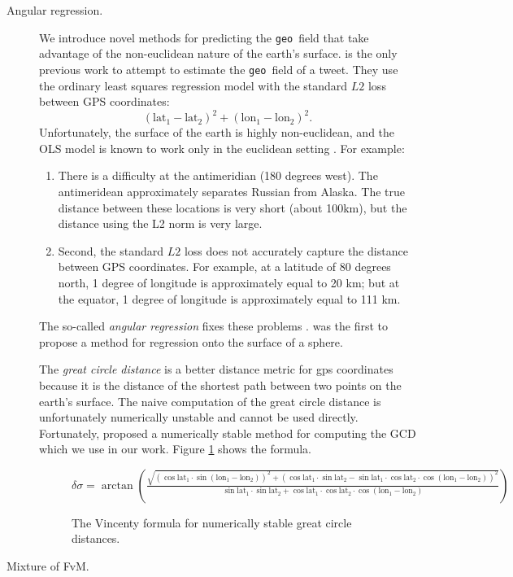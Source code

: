 \documentclass[sigconf,10pt]{acmart}
\newcommand{\tweetdata}[1]{{\texttt{#1}~}}
\newcommand{\geo          }{\tweetdata{geo}}
\newcommand{\lata}{\text{lat}_1}
\newcommand{\latb}{\text{lat}_2}
\newcommand{\latd}{(\lata-\latb)}
\newcommand{\lona}{\text{lon}_1}
\newcommand{\lonb}{\text{lon}_2}
\newcommand{\lond}{(\lona-\lonb)}
\begin{document}
{\begin{description}
\item[Angular regression.]
We introduce novel methods for predicting the \geo field that take advantage of the non-euclidean nature of the earth's surface.
\citet{duong2016near} is the only previous work to attempt to estimate the \geo field of a tweet.
They use the ordinary least squares regression model with the standard $L2$ loss between GPS coordinates:
\begin{equation}
    \latd^2 + \lond^2
    .
\end{equation}
Unfortunately, the surface of the earth is highly non-euclidean, 
and the OLS model is known to work only in the euclidean setting \citep[e.g.][]{fisher1992regression}.
For example:
\begin{enumerate}
    \item
        There is a difficulty at the antimeridian (180 degrees west).
        The antimeridean approximately separates Russian from Alaska.
        The true distance between these locations is very short (about 100km),
        but the distance using the L2 norm is very large.
    \item
        Second, the standard $L2$ loss does not accurately capture the distance between GPS coordinates.
        For example, at a latitude of 80 degrees north, 1 degree of longitude is approximately equal to 20 km;
        but at the equator, 1 degree of longitude is approximately equal to 111 km.
\end{enumerate}

The so-called \emph{angular regression} fixes these problems \citep{fisher1992regression}.
\citet{fisher1992regression} was the first to propose a method for regression onto the surface of a sphere.

The \emph{great circle distance} is a better distance metric for gps coordinates because it is the distance of the shortest path between two points on the earth's surface.
The naive computation of the great circle distance is unfortunately numerically unstable and cannot be used directly.
Fortunately, \citet{vincenty1975direct} proposed a numerically stable method for computing the GCD which we use in our work.
Figure \ref{fig:vincenty} shows the formula.

\begin{figure}
    \centering
    $
    \displaystyle
        \delta\sigma 
        =
        \arctan\left(
            \frac
            {\sqrt{(\cos\lata\cdot\sin\lond)^2 + (\cos\lata\cdot\sin\latb-\sin\lata\cdot\cos\latb\cdot\cos\lond)^2}}
            {\sin\lata\cdot\sin\latb + \cos\lata\cdot\cos\latb\cdot\cos\lond}
        \right)
    $
    \caption{The Vincenty formula for numerically stable great circle distances.}
    \label{fig:vincenty}
\end{figure}

\item[Mixture of FvM.]

\end{description}
}
\end{document}
